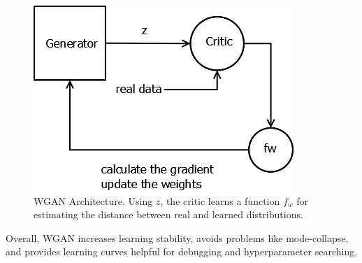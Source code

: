 \begin{figure}[h!]
	\centering
	\includegraphics[scale=0.35]{media/WGAN.png}
	\caption{WGAN Architecture. Using $z$, the critic learns a function $f_w$ for estimating the distance between real and learned distributions.} 
	\label{fig:wgan}
\end{figure}

Overall, WGAN increases learning stability, avoids problems like mode-collapse, and provides learning curves helpful for debugging and hyperparameter searching. 


